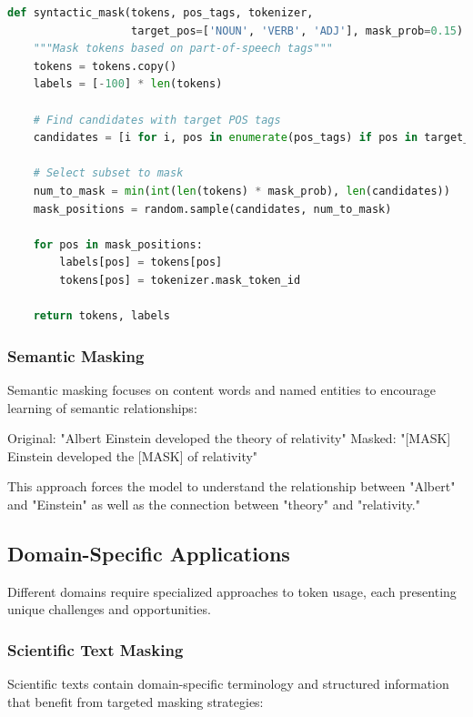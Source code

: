 \begin{lstlisting}[language=Python, caption=Syntactic masking based on POS tags]
def syntactic_mask(tokens, pos_tags, tokenizer, 
                   target_pos=['NOUN', 'VERB', 'ADJ'], mask_prob=0.15):
    """Mask tokens based on part-of-speech tags"""
    tokens = tokens.copy()
    labels = [-100] * len(tokens)
    
    # Find candidates with target POS tags
    candidates = [i for i, pos in enumerate(pos_tags) if pos in target_pos]
    
    # Select subset to mask
    num_to_mask = min(int(len(tokens) * mask_prob), len(candidates))
    mask_positions = random.sample(candidates, num_to_mask)
    
    for pos in mask_positions:
        labels[pos] = tokens[pos]
        tokens[pos] = tokenizer.mask_token_id
    
    return tokens, labels
\end{lstlisting}

\subsubsection{Semantic Masking}

Semantic masking focuses on content words and named entities to encourage learning of semantic relationships:

\begin{example}
Original: "Albert Einstein developed the theory of relativity"
Masked: "[MASK] Einstein developed the [MASK] of relativity"

This approach forces the model to understand the relationship between "Albert" and "Einstein" as well as the connection between "theory" and "relativity."
\end{example}

\subsection{Domain-Specific Applications}

Different domains require specialized approaches to \mask{} token usage, each presenting unique challenges and opportunities.

\subsubsection{Scientific Text Masking}

Scientific texts contain domain-specific terminology and structured information that benefit from targeted masking strategies:

